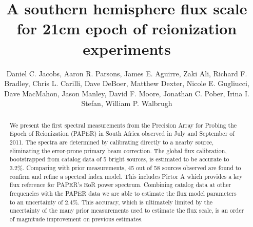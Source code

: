 \documentclass[preprint]{aastex}
\begin{document}
\title{A southern hemisphere flux scale for 21cm epoch of reionization experiments}
\author{
Daniel C. Jacobs,
Aaron R. Parsons,
James E. Aguirre,
Zaki Ali,
Richard F. Bradley,
Chris L.  Carilli,
Dave DeBoer,
Matthew Dexter,
Nicole E. Gugliucci,
Dave MacMahon,
Jason Manley,
David F. Moore,
Jonathan C. Pober,
Irina I. Stefan,
William P. Walbrugh}


\begin{abstract}
We present the first spectral measurements from the Precision Array for Probing
the Epoch of Reionization (PAPER) in South Africa observed in July and
September of 2011.  The spectra are determined by calibrating directly to a
nearby source, eliminating the error-prone primary beam correction.  The global
flux calibration, bootstrapped from catalog data of 5 bright sources, is
estimated to be accurate to 3.2\%.  Comparing with prior measurements, 45 out
of 58 sources observed are found to confirm and refine a spectral index model.
This includes Pictor A which provides a key flux reference for PAPER's EoR
power spectrum. Combining catalog data at other frequencies with the PAPER data
we are able to estimate the flux model parameters to an uncertainty of 2.4\%.
This accuracy, which is ultimately limited by the uncertainty of the many prior
measurements used to estimate the flux scale, is an order of magnitude
improvement on previous estimates.  
\end{abstract}

\end{document}
